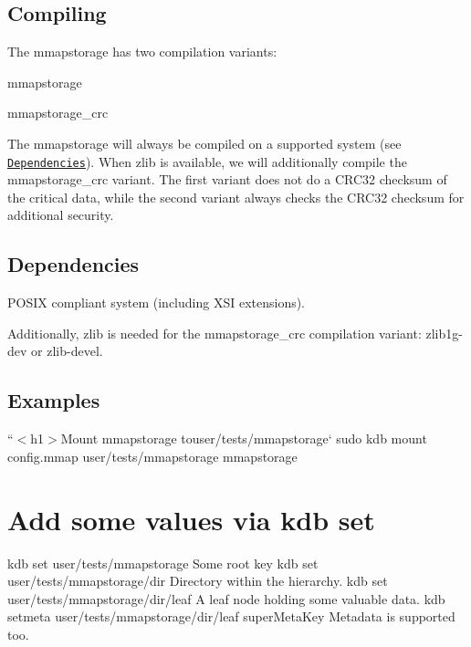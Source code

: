 \subsection*{Compiling}

The mmapstorage has two compilation variants\+:


\begin{DoxyEnumerate}
\item mmapstorage
\item mmapstorage\+\_\+crc
\end{DoxyEnumerate}

The {\ttfamily mmapstorage} will always be compiled on a supported system (see \href{#dependencies}{\tt Dependencies}). When zlib is available, we will additionally compile the {\ttfamily mmapstorage\+\_\+crc} variant. The first variant does not do a C\+R\+C32 checksum of the critical data, while the second variant always checks the C\+R\+C32 checksum for additional security.

\subsection*{Dependencies}

P\+O\+S\+IX compliant system (including X\+SI extensions).

Additionally, zlib is needed for the {\ttfamily mmapstorage\+\_\+crc} compilation variant\+: {\ttfamily zlib1g-\/dev} or {\ttfamily zlib-\/devel}.

\subsection*{Examples}

``{\ttfamily  $<$h1$>$Mount mmapstorage to}user/tests/mmapstorage` sudo kdb mount config.\+mmap user/tests/mmapstorage mmapstorage

\section*{Add some values via {\ttfamily kdb set}}

kdb set user/tests/mmapstorage \textquotesingle{}Some root key\textquotesingle{} kdb set user/tests/mmapstorage/dir \textquotesingle{}Directory within the hierarchy.\textquotesingle{} kdb set user/tests/mmapstorage/dir/leaf \textquotesingle{}A leaf node holding some valuable data.\textquotesingle{} kdb setmeta user/tests/mmapstorage/dir/leaf super\+Meta\+Key \textquotesingle{}Metadata is supported too.\textquotesingle{}

